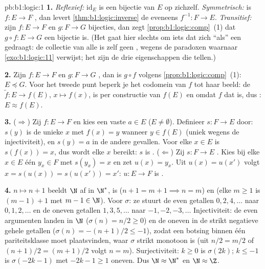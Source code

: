 \begin{solution}{pb:b1:logic:1}
\textbf{1.} \emph{Reflexief:} $\mathrm{id}_E$ is een bijectie van $E$ op
zichzelf. \emph{Symmetrisch:} is $f \colon E \to F$ , dan levert
\cref{thm:b1:logic:inverse} de eveneens  $f^{-1} \colon F \to
E$. \emph{Transitief:} zijn $f \colon E \to F$ en $g \colon F \to G$
bijecties, dan zegt \cref{prop:b1:logic:comp}~(1) dat $g \circ f \colon E
\to G$ een bijectie is. (Het gaat hier slechts om iets dat zich ``als''
een  gedraagt: de collectie van alle  is
zelf geen , wegens de paradoxen waarnaar
\cref{exo:b1:logic:11} verwijst; het zijn de drie eigenschappen die
tellen.)

\textbf{2.} Zijn $f \colon E \to F$ en $g \colon F \to G$ , dan
is $g \circ f$  volgens \cref{prop:b1:logic:comp}~(1): $E
\preceq G$. Voor het tweede punt beperk je het codomein van $f$ tot haar
beeld: de  $\tilde f \colon E \to f(E)$, $x \mapsto f(x)$, is
per constructie van $f(E)$  en  omdat $f$ dat is, dus
: $E \approx f(E)$.

\textbf{3.} ($\Rightarrow$) Zij $f \colon E \to F$  en kies een
vaste $a \in E$ ($E \neq \emptyset$). Definieer $s \colon F \to E$ door:
$s(y)$ is de unieke $x$ met $f(x) = y$ wanneer $y \in f(E)$ (uniek wegens
de injectiviteit), en $s(y) = a$ in de andere gevallen. Voor elke $x \in
E$ is $s(f(x)) = x$, dus wordt elke $x$ bereikt: $s$ is .
($\Leftarrow$) Zij $s \colon F \to E$ . Kies bij elke $x \in E$
één $y_x \in F$ met $s(y_x) = x$ en zet $u(x) = y_x$. Uit $u(x) = u(x')$
volgt $x = s(u(x)) = s(u(x')) = x'$: $u \colon E \to F$ is .

\textbf{4.} $n \mapsto n + 1$ beeldt $\N$ af in $\N^*$, is 
($n + 1 = m + 1 \implies n = m$) en  (elke $m \geq 1$ is
$(m - 1) + 1$ met $m - 1 \in \N$). Voor $\sigma$: ze stuurt de even
getallen $0, 2, 4, \dots$ naar $0, 1, 2, \dots$ en de oneven getallen
$1, 3, 5, \dots$ naar $-1, -2, -3, \dots$ Injectiviteit: de even
argumenten landen in $\N$ ($\sigma(n) = n/2 \geq 0$) en de oneven in de
strikt negatieve gehele getallen ($\sigma(n) = -(n+1)/2 \leq -1$), zodat
een botsing binnen één pariteitsklasse moet plaatsvinden, waar $\sigma$
strikt monotoon is (uit $n/2 = m/2$ of $(n+1)/2 = (m+1)/2$ volgt $n =
m$). Surjectiviteit: $k \geq 0$ is $\sigma(2k)$; $k \leq -1$ is
$\sigma(-2k - 1)$ met $-2k - 1 \geq 1$ oneven. Dus $\N \approx \N^*$ en
$\N \approx \Z$.


\end{solution}
